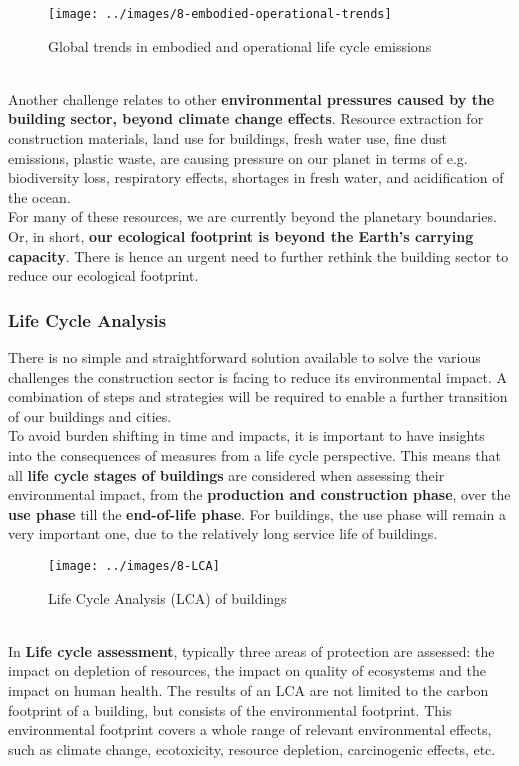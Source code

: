 \documentclass[../summary.tex]{subfiles}
\begin{document}
	\begin{figure}[H]
		\centering
		\texttt{[image: ../images/8-embodied-operational-trends]}
		\caption{Global trends in embodied and operational life cycle emissions}
		\label{fig:8-embodied-operational-trends}
	\end{figure}
	
	\ \\
	Another challenge relates to other \textbf{environmental pressures caused by the building sector, beyond climate change effects}. Resource extraction for construction materials, land use for buildings, fresh water use, fine dust emissions, plastic waste, are causing pressure on our planet in terms of e.g. biodiversity loss, respiratory effects, shortages in fresh water, and acidification of the ocean. 
	\\
	For many of these resources, we are currently beyond the planetary boundaries. Or, in short, \textbf{our ecological footprint is beyond the Earth's carrying capacity}. There is hence an urgent need to further rethink the building sector to reduce our ecological footprint. 
	
	\subsubsection{Life Cycle Analysis}
	
	There is no simple and straightforward solution available to solve the various challenges the construction sector is facing to reduce its environmental impact. A combination of steps and strategies will be required to enable a further transition of our buildings and cities.
	\\
	To avoid burden shifting in time and impacts, it is important to have insights into the consequences of measures from a life cycle perspective. This means that all \textbf{life cycle stages of buildings} are considered when assessing their environmental impact, from the \textbf{production and construction phase}, over the \textbf{use phase} till the \textbf{end-of-life phase}. For buildings, the use phase will remain a very important one, due to the relatively long service life of buildings.
	
	\begin{figure}[H]
		\centering
		\texttt{[image: ../images/8-LCA]}
		\caption{Life Cycle Analysis (LCA) of buildings}
		\label{fig:8-lca}
	\end{figure}
	
	\ \\
	In \textbf{Life cycle assessment}, typically three areas of protection are assessed: the impact on depletion of resources, the impact on quality of ecosystems and the impact on human health. The results of an LCA are not limited to the carbon footprint of a building, but consists of the environmental footprint. This environmental footprint covers a whole range of relevant environmental effects, such as climate change, ecotoxicity, resource depletion, carcinogenic effects, etc.
	
\end{document}
